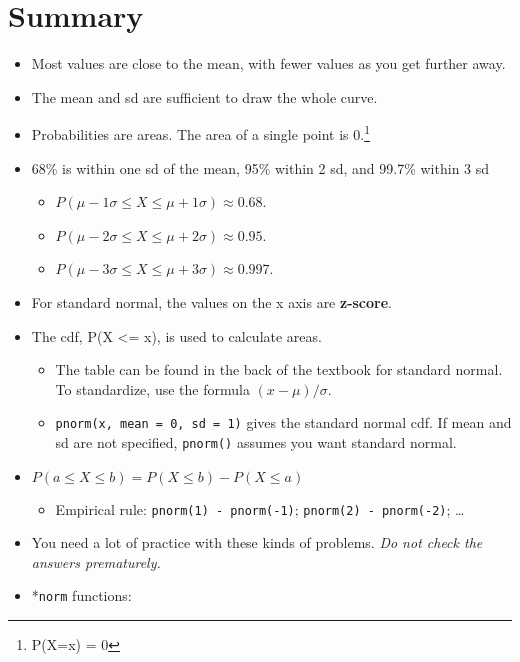 \documentclass[
  letterpaper,
  DIV=11,
  numbers=noendperiod]{scrreprt}
\providecommand{\tightlist}{%
  \setlength{\itemsep}{0pt}\setlength{\parskip}{0pt}}\usepackage{longtable,booktabs,array}
\begin{document}
\hypertarget{summary-2}{%
\section{Summary}\label{summary-2}}

\begin{itemize}
\tightlist
\item
  Most values are close to the mean, with fewer values as you get
  further away.
\item
  The mean and sd are sufficient to draw the whole curve.
\item
  Probabilities are areas. The area of a single point is 0.\footnote{P(X=x)
    = 0}
\item
  68\% is within one sd of the mean, 95\% within 2 sd, and 99.7\% within
  3 sd

  \begin{itemize}
  \tightlist
  \item
    \(P(\mu - 1\sigma \le X \le \mu + 1\sigma) \approx 0.68\).
  \item
    \(P(\mu - 2\sigma \le X \le \mu + 2\sigma) \approx 0.95\).
  \item
    \(P(\mu - 3\sigma \le X \le \mu + 3\sigma) \approx 0.997\).
  \end{itemize}
\item
  For standard normal, the values on the x axis are \textbf{z-score}.
\item
  The cdf, P(X \textless= x), is used to calculate areas.

  \begin{itemize}
  \tightlist
  \item
    The table can be found in the back of the textbook for standard
    normal. To standardize, use the formula \((x-\mu)/\sigma\).
  \item
    \texttt{pnorm(x,\ mean\ =\ 0,\ sd\ =\ 1)} gives the standard normal
    cdf. If mean and sd are not specified, \texttt{pnorm()} assumes you
    want standard normal.
  \end{itemize}
\item
  \(P(a \le X \le b) = P(X \le b) - P(X \le a)\)

  \begin{itemize}
  \tightlist
  \item
    Empirical rule: \texttt{pnorm(1)\ -\ pnorm(-1)};
    \texttt{pnorm(2)\ -\ pnorm(-2)}; \ldots{}
  \end{itemize}
\item
  You need a lot of practice with these kinds of problems. \emph{Do not
  check the answers prematurely.}
\item
  *\texttt{norm} functions:


\end{itemize}
\end{document}
